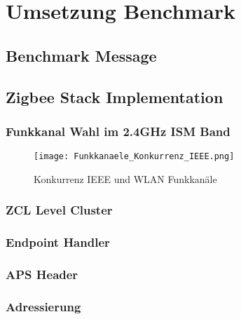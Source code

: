 \clearpage
\section{Umsetzung Benchmark}\label{sec:UmsetzungBenchmark}



\subsection{Benchmark Message}\label{subsec:BenchmarkMessage}

\subsection{Zigbee Stack Implementation}\label{subsec:ZigbeeStackImplementation}

\subsubsection{Funkkanal Wahl im 2.4GHz ISM Band}\label{subsubsec:FunkkanalWahlim2.4GHzISMBand}

\begin{figure}[h]
	\centering
	\texttt{[image: Funkkanaele\_Konkurrenz\_IEEE.png]}
	\caption{Konkurrenz IEEE und WLAN Funkkanäle \cite{markus_krause_rainer_konrad_drahtlose_2014}}
	\label{fig:KonkurrenzIEEEundWLANFunkkanäle}
\end{figure}

\subsubsection{ZCL Level Cluster}\label{subsubsec:ZCLLevelCluster}

\subsubsection{Endpoint Handler}\label{subsubsec:EndpointHandler}

\subsubsection{APS Header}\label{subsubsec:Header}

\subsubsection{Adressierung}\label{subsubsec:Adressierung}

